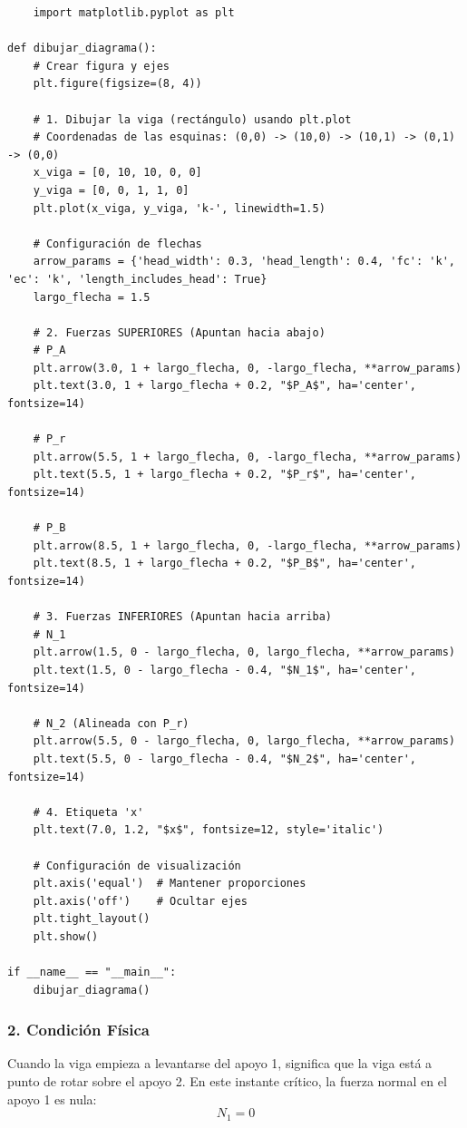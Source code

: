 \documentclass[12pt, a4paper]{article}
\begin{document}
\begin{lstlisting}
    import matplotlib.pyplot as plt

def dibujar_diagrama():
    # Crear figura y ejes
    plt.figure(figsize=(8, 4))

    # 1. Dibujar la viga (rectángulo) usando plt.plot
    # Coordenadas de las esquinas: (0,0) -> (10,0) -> (10,1) -> (0,1) -> (0,0)
    x_viga = [0, 10, 10, 0, 0]
    y_viga = [0, 0, 1, 1, 0]
    plt.plot(x_viga, y_viga, 'k-', linewidth=1.5)

    # Configuración de flechas
    arrow_params = {'head_width': 0.3, 'head_length': 0.4, 'fc': 'k', 'ec': 'k', 'length_includes_head': True}
    largo_flecha = 1.5

    # 2. Fuerzas SUPERIORES (Apuntan hacia abajo)
    # P_A
    plt.arrow(3.0, 1 + largo_flecha, 0, -largo_flecha, **arrow_params)
    plt.text(3.0, 1 + largo_flecha + 0.2, "$P_A$", ha='center', fontsize=14)

    # P_r
    plt.arrow(5.5, 1 + largo_flecha, 0, -largo_flecha, **arrow_params)
    plt.text(5.5, 1 + largo_flecha + 0.2, "$P_r$", ha='center', fontsize=14)

    # P_B
    plt.arrow(8.5, 1 + largo_flecha, 0, -largo_flecha, **arrow_params)
    plt.text(8.5, 1 + largo_flecha + 0.2, "$P_B$", ha='center', fontsize=14)

    # 3. Fuerzas INFERIORES (Apuntan hacia arriba)
    # N_1
    plt.arrow(1.5, 0 - largo_flecha, 0, largo_flecha, **arrow_params)
    plt.text(1.5, 0 - largo_flecha - 0.4, "$N_1$", ha='center', fontsize=14)

    # N_2 (Alineada con P_r)
    plt.arrow(5.5, 0 - largo_flecha, 0, largo_flecha, **arrow_params)
    plt.text(5.5, 0 - largo_flecha - 0.4, "$N_2$", ha='center', fontsize=14)

    # 4. Etiqueta 'x'
    plt.text(7.0, 1.2, "$x$", fontsize=12, style='italic')

    # Configuración de visualización
    plt.axis('equal')  # Mantener proporciones
    plt.axis('off')    # Ocultar ejes
    plt.tight_layout()
    plt.show()

if __name__ == "__main__":
    dibujar_diagrama()
\end{lstlisting}

\subsubsection*{2. Condición Física}
Cuando la viga empieza a levantarse del apoyo 1, significa que la viga está a punto de rotar sobre el apoyo 2.
En este instante crítico, la fuerza normal en el apoyo 1 es nula:
$$ N_1 = 0 $$
\end{document}

